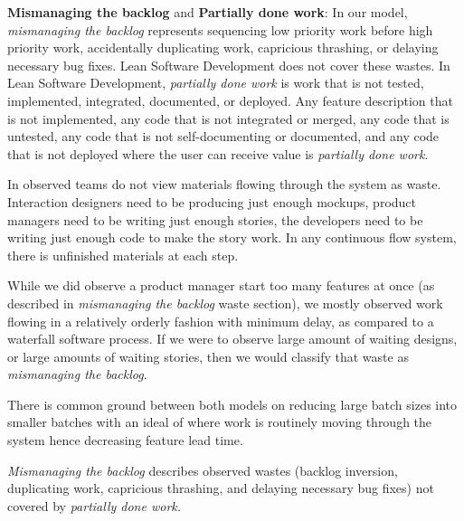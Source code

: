 \textbf{Mismanaging the backlog} and \textbf{Partially done work}: In our model, \textit{mismanaging the backlog} represents sequencing low priority work before high priority work, accidentally duplicating work, capricious thrashing, or delaying necessary bug fixes. Lean Software Development does not cover these wastes. In Lean Software Development, \textit{partially done work} is work that is not tested, implemented, integrated, documented, or deployed. Any feature description that is not implemented, any code that is not integrated or merged, any code that is untested, any code that is not self-documenting or documented, and any code that is not deployed where the user can receive value is \textit{partially done work}.

In observed teams do not view materials flowing through the system as waste. Interaction designers need to be producing just enough mockups, product managers need to be writing just enough stories, the developers need to be writing just enough code to make the story work. In any continuous flow system, there is unfinished materials at each step. 

While we did observe a product manager start too many features at once (as described in \textit{mismanaging the backlog} waste section), we mostly observed work flowing in a relatively orderly fashion with minimum delay, as compared to a waterfall software process. If we were to observe large amount of waiting designs, or large amounts of waiting stories, then we would classify that waste as \textit{mismanaging the backlog}.

There is common ground between both models on reducing large batch sizes into smaller batches with an ideal of   where work is routinely moving through the system hence decreasing feature lead time. 

\textit{Mismanaging the backlog} describes observed wastes (backlog inversion, duplicating work, capricious thrashing, and delaying necessary bug fixes) not covered by \textit{partially done work.}




